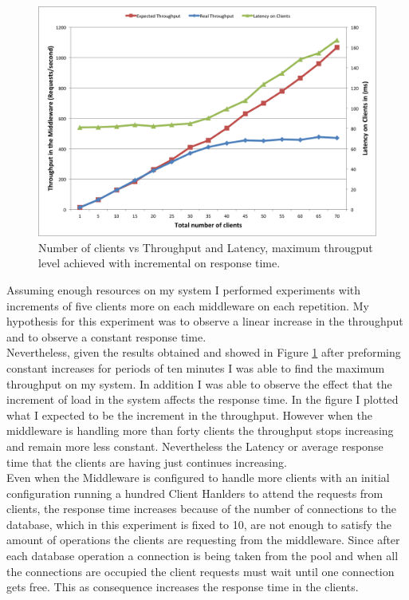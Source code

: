\begin{figure}[h!]
	\centering
	\includegraphics[scale=0.4]{through.png}
	\caption{Number of clients vs Throughput and Latency, maximum througput level achieved with incremental on response time.}
	\label{through}
\end{figure}

Assuming enough resources on my system I performed experiments with increments of five clients more on each middleware on each repetition. My hypothesis for this experiment was to observe a linear increase in the throughput and to observe a constant response time.\\

Nevertheless, given the results obtained and showed in Figure \ref{through}  after preforming constant increases for periods of ten minutes I was able to find the maximum throughput on my system. In addition I was able to observe the effect that the increment of load in the system affects the response time. In the figure I plotted what I expected to be the increment in the throughput. However when the middleware is handling more than forty clients the throughput stops increasing and remain more less constant. Nevertheless the Latency or average response time that the clients are having just continues increasing.\\

Even when the Middleware is configured to handle more clients with an initial configuration running a hundred Client Hanlders to attend the requests from clients, the response time increases because of the number of connections to the database, which in this experiment is fixed to 10, are not enough to satisfy the amount of operations the clients are requesting from the middleware. Since after each database operation a connection is being taken from the pool and when all the connections are occupied the client requests must wait until one connection gets free. This as consequence increases the response time in the clients.\\

